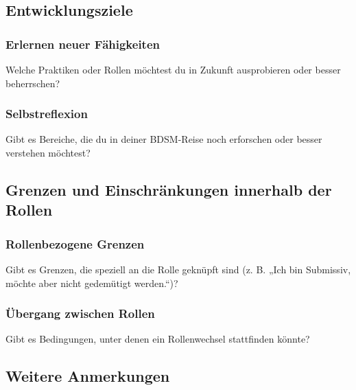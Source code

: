 \documentclass[a4paper,12pt]{article}
\begin{document}
\subsection{Entwicklungsziele}
\subsubsection{Erlernen neuer Fähigkeiten}
\noindent Welche Praktiken oder Rollen möchtest du in Zukunft ausprobieren oder besser beherrschen? \newline
\noindent \TextField[name=ZieleNeues,multiline=true,height=7em, width=37em]{}

\subsubsection{Selbstreflexion}
\noindent Gibt es Bereiche, die du in deiner BDSM-Reise noch erforschen oder besser verstehen möchtest? \newline
\noindent \TextField[name=ZieleReflektion,multiline=true,height=7em, width=37em]{}

\subsection{Grenzen und Einschränkungen innerhalb der Rollen}
\subsubsection{Rollenbezogene Grenzen}
\noindent Gibt es Grenzen, die speziell an die Rolle geknüpft sind (z. B. „Ich bin Submissiv, möchte aber nicht gedemütigt werden.“)?\newline
\noindent \TextField[name=GrenzRolleInnerhalb,multiline=true,height=7em, width=37em]{}

\subsubsection{Übergang zwischen Rollen}
\noindent Gibt es Bedingungen, unter denen ein Rollenwechsel stattfinden könnte? \newline
\noindent \TextField[name=RolleUebergang,multiline=true,height=7em, width=37em]{}

\subsection{Weitere Anmerkungen}
\noindent \TextField[name=AftercareBesonders,multiline=true,height=17em, width=37em]{}
\end{document}
